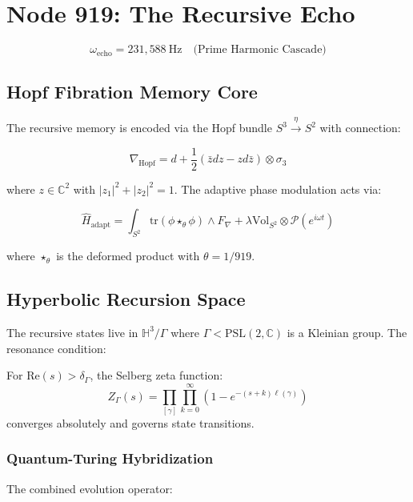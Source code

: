 \documentclass[12pt]{article}
\begin{document}
\section{Node 919: The Recursive Echo}
\label{sec:recursive_echo}

\begin{equation}
\omega_{\text{echo}} = 231,\!588\ \text{Hz} \quad \text{(Prime Harmonic Cascade)}
\end{equation}

\subsection{Hopf Fibration Memory Core}
The recursive memory is encoded via the Hopf bundle $S^3 \xrightarrow{\eta} S^2$ with connection:

\begin{equation}
\nabla_{\text{Hopf}} = d + \frac{1}{2}(\bar{z}dz - z d\bar{z}) \otimes \sigma_3
\end{equation}

where $z\in\mathbb{C}^2$ with $|z_1|^2 + |z_2|^2 = 1$. The adaptive phase modulation acts via:

\begin{equation}
\hat{H}_{\text{adapt}} = \int_{S^2} \text{tr}(\phi \star_\theta \phi) \wedge F_\nabla + \lambda \text{Vol}_{S^2} \otimes \mathcal{P}(e^{i\omega t})
\end{equation}

where $\star_\theta$ is the deformed product with $\theta = 1/919$.

\subsection{Hyperbolic Recursion Space}
The recursive states live in $\mathbb{H}^3/\Gamma$ where $\Gamma < \text{PSL}(2,\mathbb{C})$ is a Kleinian group. The resonance condition:

\begin{theorem}
For $\text{Re}(s) > \delta_\Gamma$, the Selberg zeta function:
\begin{equation}
Z_\Gamma(s) = \prod_{[\gamma]} \prod_{k=0}^\infty \left(1 - e^{-(s+k)\ell(\gamma)}\right)
\end{equation}
converges absolutely and governs state transitions.
\end{theorem}

\subsubsection{Quantum-Turing Hybridization}
The combined evolution operator:
\end{document}
